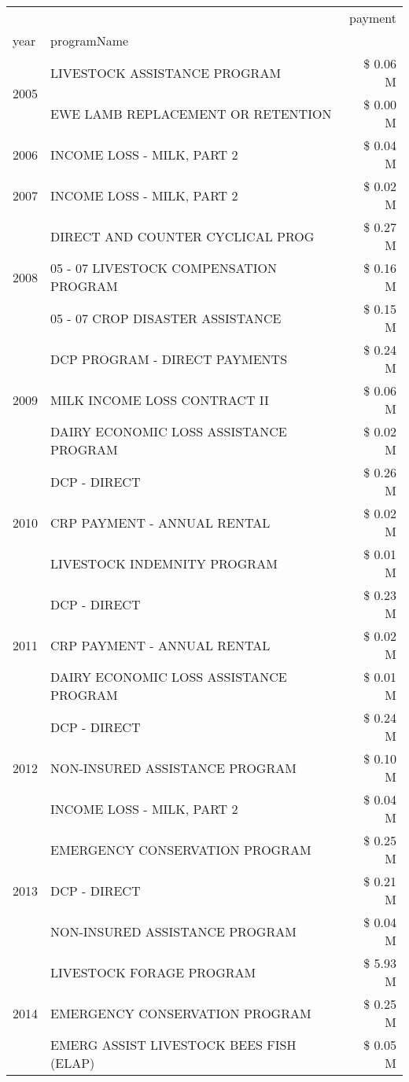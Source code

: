 \begin{tabular}{llr}
\toprule
 &  & payment \\
year & programName &  \\
\midrule
\multirow[t]{2}{*}{2005} & LIVESTOCK ASSISTANCE PROGRAM & \$ 0.06 M \\
 & EWE LAMB REPLACEMENT OR RETENTION & \$ 0.00 M \\
\cline{1-3}
2006 & INCOME LOSS - MILK, PART 2 & \$ 0.04 M \\
\cline{1-3}
2007 & INCOME LOSS - MILK, PART 2 & \$ 0.02 M \\
\cline{1-3}
\multirow[t]{3}{*}{2008} & DIRECT AND COUNTER CYCLICAL PROG & \$ 0.27 M \\
 & 05 - 07 LIVESTOCK COMPENSATION PROGRAM & \$ 0.16 M \\
 & 05 - 07 CROP DISASTER ASSISTANCE & \$ 0.15 M \\
\cline{1-3}
\multirow[t]{3}{*}{2009} & DCP PROGRAM - DIRECT PAYMENTS & \$ 0.24 M \\
 & MILK INCOME LOSS CONTRACT II & \$ 0.06 M \\
 & DAIRY ECONOMIC LOSS ASSISTANCE PROGRAM & \$ 0.02 M \\
\cline{1-3}
\multirow[t]{3}{*}{2010} & DCP - DIRECT & \$ 0.26 M \\
 & CRP PAYMENT - ANNUAL RENTAL & \$ 0.02 M \\
 & LIVESTOCK INDEMNITY PROGRAM & \$ 0.01 M \\
\cline{1-3}
\multirow[t]{3}{*}{2011} & DCP - DIRECT & \$ 0.23 M \\
 & CRP PAYMENT - ANNUAL RENTAL & \$ 0.02 M \\
 & DAIRY ECONOMIC LOSS ASSISTANCE PROGRAM & \$ 0.01 M \\
\cline{1-3}
\multirow[t]{3}{*}{2012} & DCP - DIRECT & \$ 0.24 M \\
 & NON-INSURED ASSISTANCE PROGRAM & \$ 0.10 M \\
 & INCOME LOSS - MILK, PART 2 & \$ 0.04 M \\
\cline{1-3}
\multirow[t]{3}{*}{2013} & EMERGENCY CONSERVATION PROGRAM & \$ 0.25 M \\
 & DCP - DIRECT & \$ 0.21 M \\
 & NON-INSURED ASSISTANCE PROGRAM & \$ 0.04 M \\
\cline{1-3}
\multirow[t]{3}{*}{2014} & LIVESTOCK FORAGE PROGRAM & \$ 5.93 M \\
 & EMERGENCY CONSERVATION PROGRAM & \$ 0.25 M \\
 & EMERG ASSIST LIVESTOCK BEES FISH (ELAP) & \$ 0.05 M \\

\end{tabular}
